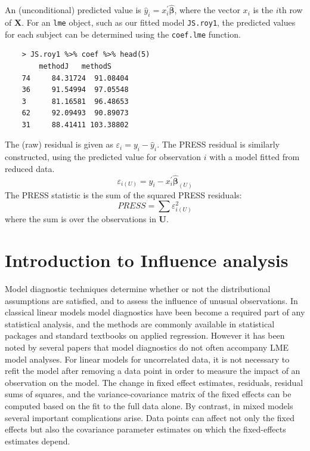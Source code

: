 \documentclass[Main.tex]{subfiles}
\begin{document}
An (unconditional) predicted value is $\hat{y}_i = x^{\prime}_i \boldsymbol{\hat{\beta}}$, where 
the vector $x_i$ is the $i$th row of $\boldsymbol{X}$. For an \texttt{lme} object, such as our fitted model \texttt{JS.roy1}, the predicted values for each subject can be determined using the \texttt{coef.lme} function.
\begin{framed}
	\begin{verbatim}
	> JS.roy1 %>% coef %>% head(5)
        methodJ   methodS
	74     84.31724  91.08404
	36     91.54994  97.05548
	3      81.16581  96.48653
	62     92.09493  90.89073
	31     88.41411 103.38802
	\end{verbatim}
\end{framed}



The (raw) residual is given as $\varepsilon_i = y_i - \hat{y}_i$. The PRESS residual is
similarly constructed, using the predicted value for observation $i$ with a model fitted from reduced data.
\[ \varepsilon_{i(U)} = y_i - x^{\prime}_i \boldsymbol{\hat{\beta}}_{(U)} \]
The PRESS statistic is the sum of the squared PRESS residuals:
\[ PRESS = \sum \varepsilon^2_{i(U)} \]
where the sum is over the observations in $\boldsymbol{U}$.


\newpage
\section{Introduction to Influence analysis} %
 Model diagnostic techniques determine whether or not the distributional assumptions are satisfied, and to assess the influence of unusual observations. In classical linear models model diagnostics have been become a required part of any statistical analysis, and the methods are commonly available in statistical packages and standard textbooks on applied regression. However it has been noted by several papers that model diagnostics do not often accompany LME model analyses.
For linear models for uncorrelated data, it is not necessary to refit the model after removing a data point in order to measure the impact of an observation on the model. The change in fixed effect estimates, residuals, residual sums of squares, and the variance-covariance matrix of the fixed effects can be computed based on the fit to the full data alone. By contrast, in mixed models several important complications arise. Data points can affect not only the fixed effects but also the covariance parameter estimates on which the fixed-effects estimates depend. 
\end{document}
